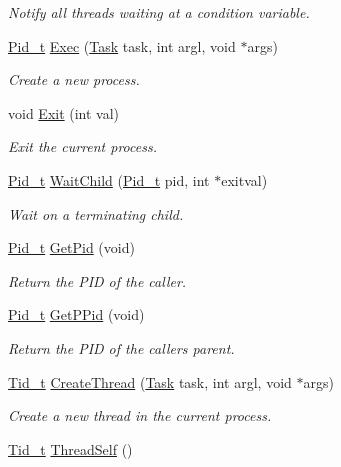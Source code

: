 \begin{DoxyCompactItemize}
\begin{DoxyCompactList}\small\item\em Notify all threads waiting at a condition variable. \end{DoxyCompactList}\item 
\hyperlink{group__syscalls_gafac07f3170763932fac97b6eab2c3984}{Pid\+\_\+t} \hyperlink{group__syscalls_ga737ad30d8105b4b76e3eb102dd016404}{Exec} (\hyperlink{group__syscalls_gaec3f2f835e105271fbbc00272c0ba984}{Task} task, int argl, void $\ast$args)
\begin{DoxyCompactList}\small\item\em Create a new process. \end{DoxyCompactList}\item 
void \hyperlink{group__syscalls_gabed0249344c12ecd4f8d440fc05a360a}{Exit} (int val)
\begin{DoxyCompactList}\small\item\em Exit the current process. \end{DoxyCompactList}\item 
\hyperlink{group__syscalls_gafac07f3170763932fac97b6eab2c3984}{Pid\+\_\+t} \hyperlink{group__syscalls_ga37017afba05480740d26b033975fef03}{Wait\+Child} (\hyperlink{group__syscalls_gafac07f3170763932fac97b6eab2c3984}{Pid\+\_\+t} pid, int $\ast$exitval)
\begin{DoxyCompactList}\small\item\em Wait on a terminating child. \end{DoxyCompactList}\item 
\hyperlink{group__syscalls_gafac07f3170763932fac97b6eab2c3984}{Pid\+\_\+t} \hyperlink{group__syscalls_ga5106ac1f078c5dde2d6fea3881c1a4fb}{Get\+Pid} (void)
\begin{DoxyCompactList}\small\item\em Return the P\+ID of the caller. \end{DoxyCompactList}\item 
\hyperlink{group__syscalls_gafac07f3170763932fac97b6eab2c3984}{Pid\+\_\+t} \hyperlink{group__syscalls_ga33ccb3f7c80d85e610206c0e1150657b}{Get\+P\+Pid} (void)
\begin{DoxyCompactList}\small\item\em Return the P\+ID of the caller\textquotesingle{}s parent. \end{DoxyCompactList}\item 
\hyperlink{group__syscalls_gaf67ad1c55e6b2a79bf8a99106380ce01}{Tid\+\_\+t} \hyperlink{group__syscalls_ga284070b5fddcc3653e146e63fcbfe6e3}{Create\+Thread} (\hyperlink{group__syscalls_gaec3f2f835e105271fbbc00272c0ba984}{Task} task, int argl, void $\ast$args)
\begin{DoxyCompactList}\small\item\em Create a new thread in the current process. \end{DoxyCompactList}\item 
\hyperlink{group__syscalls_gaf67ad1c55e6b2a79bf8a99106380ce01}{Tid\+\_\+t} \hyperlink{group__syscalls_ga75ffeb50fda6297110a2f07ef94d285c}{Thread\+Self} ()\hypertarget{group__syscalls_ga75ffeb50fda6297110a2f07ef94d285c}{}\label{group__syscalls_ga75ffeb50fda6297110a2f07ef94d285c}


\end{DoxyCompactItemize}
